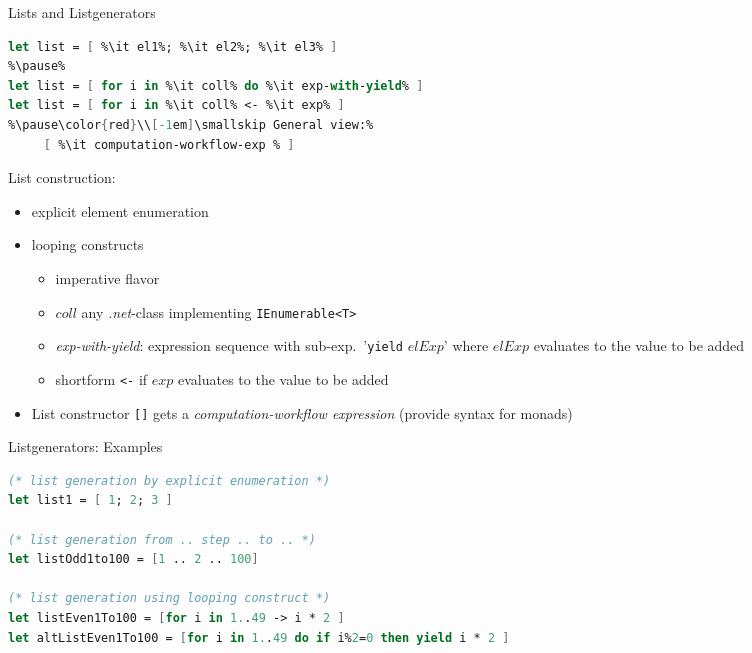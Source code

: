\documentclass{beamer}
\begin{document}
\begin{frame}[fragile]{Lists and Listgenerators}
\begin{overlayarea}{\textwidth}{0.35\textheight}
\begin{lstlisting}[language=FSharp, escapechar=\%]
let list = [ %\it el1%; %\it el2%; %\it el3% ]   
%\pause%
let list = [ for i in %\it coll% do %\it exp-with-yield% ]   
let list = [ for i in %\it coll% <- %\it exp% ]   
%\pause\color{red}\\[-1em]\smallskip General view:%
     [ %\it computation-workflow-exp % ]   
\end{lstlisting}
\end{overlayarea}
List construction:
\begin{itemize}
\item<1-> explicit element enumeration
\item<2-> looping constructs
  \begin{itemize}
    \item imperative flavor
    \item $coll$ any \textsl{.net}-class implementing \texttt{IEnumerable<T>} 
    \item \textit{exp-with-yield}: expression sequence with sub-exp.\ '\lstinline!yield! $elExp$' where $elExp$ evaluates to the value to be added
    \item shortform \lstinline!<-! if $exp$ evaluates to the value to be added 
 \end{itemize}
\item<3-> List constructor \lstinline![]! gets a
  \emph{computation-workflow expression} (provide syntax for monads)
\end{itemize}
\end{frame}

\begin{frame}[fragile]{Listgenerators: Examples}
\begin{lstlisting}[language=FSharp]
 (* list generation by explicit enumeration *)
let list1 = [ 1; 2; 3 ] 

(* list generation from .. step .. to .. *)
let listOdd1to100 = [1 .. 2 .. 100]

(* list generation using looping construct *)
let listEven1To100 = [for i in 1..49 -> i * 2 ]  
let altListEven1To100 = [for i in 1..49 do if i%2=0 then yield i * 2 ]  

\end{lstlisting}
\end{frame}
\end{document}
